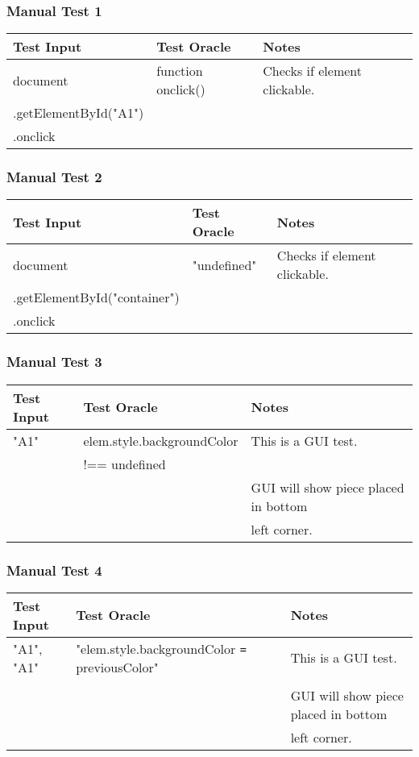 \documentclass[11pt]{article}
\begin{document}
\subsubsection{Manual Test 1}
\label{sec:org34bd832}
\begin{center}
\begin{tabular}{|p{6.0cm}|p{4.0cm}|p{3.0cm}|}
Test Input & Test Oracle & Notes\\
\hline
document & function onclick() & Checks if element clickable.\\
.getElementById("A1") &  & \\
.onclick &  & \\
\end{tabular}
\end{center}

\subsubsection{Manual Test 2}
\label{sec:org4ae36a1}
\begin{center}
\begin{tabular}{|p{6.0cm}|p{4.0cm}|p{3.0cm}|}
Test Input & Test Oracle & Notes\\
\hline
document & "undefined" & Checks if element clickable.\\
.getElementById("container") &  & \\
.onclick &  & \\
\end{tabular}
\end{center}

\subsubsection{Manual Test 3}
\label{sec:orgbcad7ac}
\begin{center}
\begin{tabular}{|p{4.0cm}|p{6.0cm}|p{3.0cm}|}
Test Input & Test Oracle & Notes\\
\hline
"A1" & elem.style.backgroundColor & This is a GUI test.\\
 & !== undefined & \\
 &  & GUI will show piece placed in bottom\\
 &  & left corner.\\
\end{tabular}
\end{center}

\subsubsection{Manual Test 4}
\label{sec:org12afbb2}
\begin{center}
\begin{tabular}{|p{2.0cm}|p{8.0cm}|p{3.0cm}|}
Test Input & Test Oracle & Notes\\
\hline
"A1", "A1" & "elem.style.backgroundColor \texttt{=} previousColor" & This is a GUI test.\\
 &  & \\
 &  & GUI will show piece placed in bottom\\
 &  & left corner.\\
\end{tabular}
\end{center}
\end{document}
